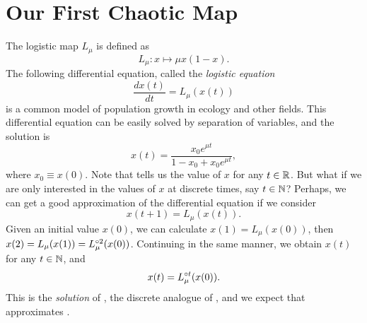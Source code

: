 \documentclass[12pt,twoside]{book}
\begin{document}
\section{Our First Chaotic Map}
The logistic map $L_\mu$ is defined as 
\begin{equation*}
  L_{\mu}: x \mapsto \mu x(1-x).
\end{equation*}
The following differential equation, called the \textit{logistic equation}
\begin{equation}
  \frac{dx(t)}{dt} = L_{\mu}(x(t))
  \label{eqn:lde}
\end{equation}
is a common model of population growth in ecology and other fields.
This differential equation can be easily solved by separation of variables, and the solution is
\begin{equation}
  x(t) = \frac{x_0 e^{\mu t}}{1 - x_0 + x_0 e^{\mu t}},
  \label{eqn:ldesoln}
\end{equation}
where $x_0 \equiv x(0)$.
Note that  tells us the value of $x$ for any $t \in \mathbb{R}$.
But what if we are only interested in the values of $x$ at discrete times, say $t \in \mathbb{N}$?
Perhaps, we can get a good approximation of the differential equation if we consider
\begin{equation}
  x(t + 1) = L_{\mu}(x(t)).
  \label{eqn:logistic}
\end{equation}
Given an initial value $x(0)$, we can calculate $x(1) = L_\mu(x(0))$, then $x(2) = L_\mu(x(1)) = L_\mu^{\circ 2}(x(0))$.
Continuing in the same manner, we obtain $x(t)$ for any $t \in \mathbb{N}$, and 
\begin{equation}
  x(t) = L_\mu^{\circ t}(x(0)).
  \label{eqn:logisticsoln}
\end{equation}
This is the \textit{solution} of , the discrete analogue of , and we expect that  approximates .
\end{document}
